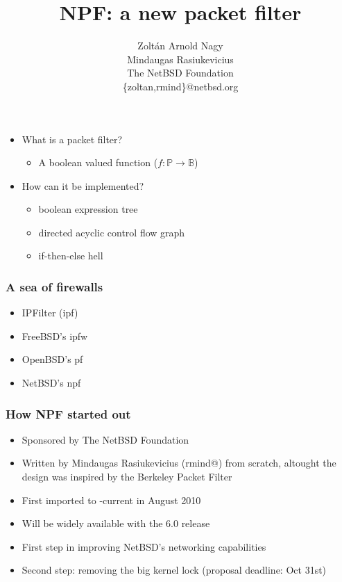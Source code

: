 \documentclass[magyar]{beamer}
\date{}
\begin{document}
\title{NPF: a new packet filter}
\author{Zoltán Arnold Nagy\\ Mindaugas Rasiukevicius \\ The NetBSD Foundation \\ \{zoltan,rmind\}@netbsd.org}
\maketitle

\begin{frame}
\begin{itemize}
	\item What is a packet filter?
\pause
	\begin{itemize}
		\item A boolean valued function ($f:\mathbb{P} \rightarrow \mathbb{B}$)
	\end{itemize}
\pause
	\item How can it be implemented?
\pause
	\begin{itemize}
		\item boolean expression tree
		\item directed acyclic control flow graph
		\item if-then-else hell
	\end{itemize}
\end{itemize}
\end{frame}

\begin{frame}
\frametitle{A sea of firewalls}
\begin{itemize}
	\item IPFilter (ipf)
	\item FreeBSD's ipfw
	\item OpenBSD's pf
	\item NetBSD's npf
\end{itemize}
\end{frame}

\begin{frame}
\frametitle{How NPF started out}
\begin{itemize}
	\item Sponsored by The NetBSD Foundation
	\item Written by Mindaugas Rasiukevicius (rmind@) from scratch, altought the design was inspired by the Berkeley Packet Filter
	\item First imported to -current in August 2010
	\item Will be widely available with the 6.0 release
	\item First step in improving NetBSD's networking capabilities
	\item Second step: removing the big kernel lock (proposal deadline: Oct 31st)
\end{itemize}
\end{frame}
\end{document}
